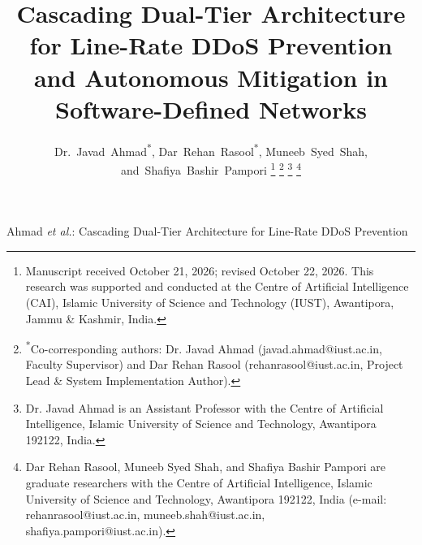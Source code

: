 \documentclass[journal]{IEEEtran}
\begin{document}
\title{Cascading Dual-Tier Architecture for Line-Rate DDoS Prevention and Autonomous Mitigation in Software-Defined Networks}

\author{Dr.~Javad~Ahmad\textsuperscript{*},
        Dar~Rehan~Rasool\textsuperscript{*},
        Muneeb~Syed~Shah,
        and~Shafiya~Bashir~Pampori%
\thanks{Manuscript received October 21, 2026; revised October 22, 2026. This research was supported and conducted at the Centre of Artificial Intelligence (CAI), Islamic University of Science and Technology (IUST), Awantipora, Jammu \& Kashmir, India.}%
\thanks{\textsuperscript{*}Co-corresponding authors: Dr. Javad Ahmad (javad.ahmad@iust.ac.in, Faculty Supervisor) and Dar Rehan Rasool (rehanrasool@iust.ac.in, Project Lead \& System Implementation Author).}%
\thanks{Dr. Javad Ahmad is an Assistant Professor with the Centre of Artificial Intelligence, Islamic University of Science and Technology, Awantipora 192122, India.}%
\thanks{Dar Rehan Rasool, Muneeb Syed Shah, and Shafiya Bashir Pampori are graduate researchers with the Centre of Artificial Intelligence, Islamic University of Science and Technology, Awantipora 192122, India (e-mail: rehanrasool@iust.ac.in, muneeb.shah@iust.ac.in, shafiya.pampori@iust.ac.in).}%
}

%
{Ahmad \MakeLowercase{\textit{et al.}}: Cascading Dual-Tier Architecture for Line-Rate DDoS Prevention}

\maketitle
\end{document}
